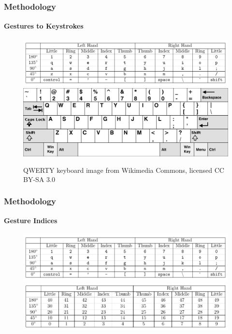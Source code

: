 \documentclass[xcolor={svgnames,table},10pt,fleqn]{beamer}
\begin{document}
\begin{frame}
    \frametitle{Methodology}
    \framesubtitle{Gestures to Keystrokes}
    \begin{figure}[h]
        \centering
        \includegraphics[width=\textwidth]{imgs/gesture_to_keystrokes.pdf}
        \includegraphics[width=\textwidth]{imgs/qwerty_keyboard.png}
        \caption{QWERTY keyboard image from Wikimedia Commons, licensed CC BY-SA 3.0}
    \end{figure}
\end{frame}

\begin{frame}
    \frametitle{Methodology}
    \framesubtitle{Gesture Indices}
    \begin{figure}[h]
        \centering
        \includegraphics[width=\textwidth]{imgs/gesture_to_keystrokes.pdf}
        \includegraphics[width=\textwidth]{imgs/gesture_to_indices.pdf}
    \end{figure}
\end{frame}
\end{document}
